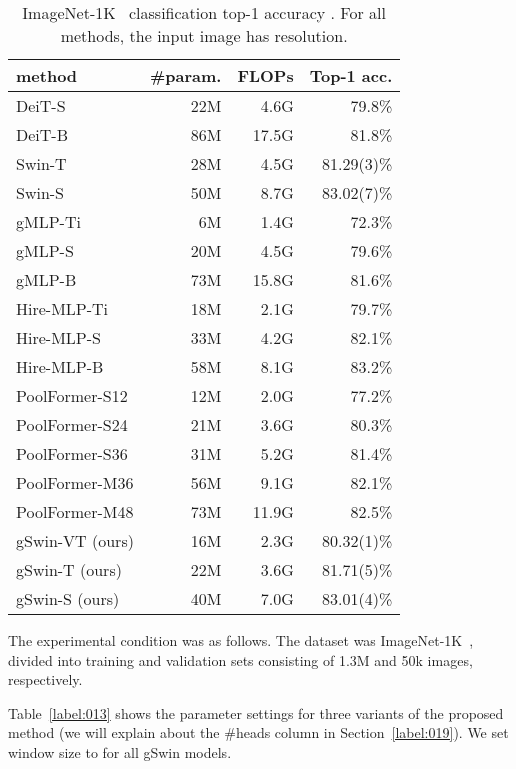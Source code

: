 \documentclass{article}
\begin{document}
\begin{table}[!t]
	\centering
    {
	\begin{tabular}{lrrr}
		\toprule
		method          & \#param. & FLOPs & Top-1 acc. \\
		\midrule
		DeiT-S
		& 22M      & 4.6G  & 79.8\%     \\
		DeiT-B
		& 86M      & 17.5G & 81.8\%     \\
		Swin-T
		& 28M      & 4.5G  & 81.29(3)\%     \\
		Swin-S
		& 50M      & 8.7G  & 83.02(7)\%     \\
		\midrule
		gMLP-Ti
		& 6M       & 1.4G  & 72.3\%     \\
		gMLP-S
		& 20M      & 4.5G  & 79.6\%     \\
		gMLP-B
		& 73M      & 15.8G & 81.6\%     \\
		Hire-MLP-Ti
		& 18M      & 2.1G  & 79.7\%     \\
		Hire-MLP-S
		& 33M      & 4.2G  & 82.1\%     \\
		Hire-MLP-B
		& 58M      & 8.1G  & 83.2\%     \\ 
		\midrule
		PoolFormer-S12
		& 12M      & 2.0G  & 77.2\%     \\
		PoolFormer-S24
		& 21M      & 3.6G  & 80.3\%     \\
		PoolFormer-S36
		& 31M      & 5.2G  & 81.4\%     \\
		PoolFormer-M36
		& 56M      & 9.1G  & 82.1\%     \\
		PoolFormer-M48
		& 73M      & 11.9G & 82.5\%     \\
		\midrule
		gSwin-VT (ours) & 16M      & 2.3G  & 80.32(1)\%     \\
		gSwin-T (ours)  & 22M      & 3.6G  & 81.71(5)\%     \\
		gSwin-S (ours)  & 40M      & 7.0G  & 83.01(4)\%     \\
		\bottomrule
	\end{tabular}
	}
	\caption{
		ImageNet-1K~\cite{deng2009imagenet} classification top-1 accuracy . For all methods, the input image has  resolution.
	}
    \label{label:015}
\end{table}
The experimental condition was as follows.
The dataset was ImageNet-1K~\citep{deng2009imagenet}, divided into training and validation sets consisting of 1.3M and 50k images, respectively.

Table~\ref{label:013} shows the parameter settings
for three variants of the proposed method (we will explain about the \#heads column in Section~\ref{label:019}).
We set window size to  for all gSwin models.
\end{document}
